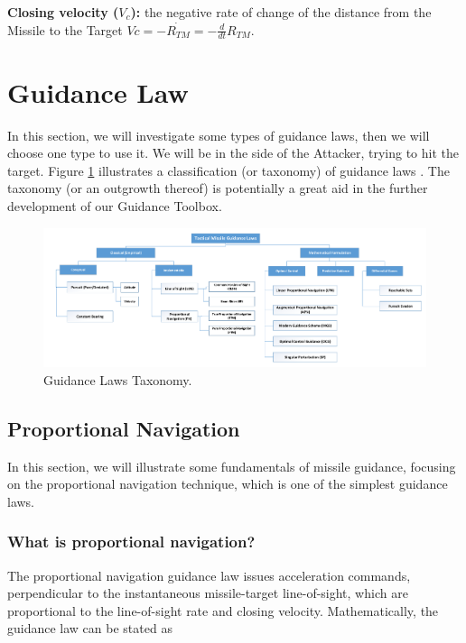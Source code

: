 \textbf{Closing velocity ($V_c$):} the negative rate of change of the distance
from the Missile to the Target $Vc= -\dot{R_{TM}}=-\frac{d}{dt} R_{TM} $.


\section{Guidance Law}


In this section, we will investigate some types of guidance laws, then we will choose one type to use it. We will be in the side of the Attacker, trying to hit the target. Figure \ref{GL taxonomy} illustrates a classification (or taxonomy) of guidance laws \cite{ghose2012guidance}. The taxonomy (or an outgrowth thereof) is potentially a great aid in the further development of our Guidance Toolbox.

\begin{landscape}
\begin{figure}[H]
	\centering
	\includegraphics[scale = 0.5]{fig/GuidanceLaws.pdf}
	\caption{Guidance Laws Taxonomy.}
	\label{GL taxonomy}
\end{figure}
\end{landscape}

\subsection{Proportional Navigation}
In this section, we will illustrate some fundamentals of missile guidance, focusing on the proportional navigation technique, which is one of the simplest guidance laws.

\subsubsection*{What is proportional navigation?}
The proportional navigation guidance law issues acceleration commands,
perpendicular to the instantaneous missile-target line-of-sight, which are
proportional to the line-of-sight rate and closing velocity. Mathematically, the
guidance law can be stated as

